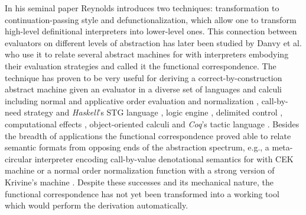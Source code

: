 In his seminal paper \cite{reynolds} Reynolds introduces two techniques: transformation to continuation-passing style and defunctionalization, which allow one to transform high-level definitional interpreters into lower-level ones.
This connection between evaluators on different levels of abstraction has later been studied by Danvy et al.\cite{functional-correspondence} who use it to relate several abstract machines for \LC{} with interpreters embodying their evaluation strategies and called it the functional correspondence.
The technique has proven to be very useful for deriving a correct-by-construction abstract machine given an evaluator in a diverse set of languages and calculi including normal and applicative order \LC{} evaluation \cite{functional-correspondence} and normalization \cite{ager-interpreter-compiler}, call-by-need strategy \cite{ager-call-by-need} and \textit{Haskell}'s STG language \cite{pirog-stg}, logic engine \cite{biernacki-logic-engine}, delimited control \cite{biernacka-delimited-continuations}, computational effects \cite{ager-monadic-evaluators}, object-oriented calculi \cite{danvy-object-oriented} and \textit{Coq}'s tactic language \cite{jedynak-ltac}.
Besides the breadth of applications the functional correspondence proved able to relate semantic formats from opposing ends of the abstraction spectrum, e.g.,
a meta-circular interpreter encoding call-by-value denotational semantics for \LC{} with CEK machine or a normal order normalization function with a strong version of Krivine's machine \cite{ager-interpreter-compiler}.
Despite these successes and its mechanical nature, the functional correspondence has not yet been transformed into a working tool which would perform the derivation automatically.

